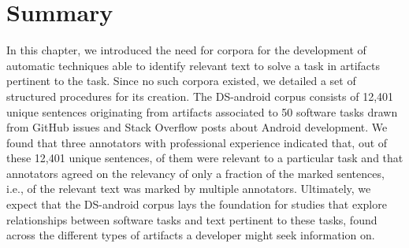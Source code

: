 
\section{Summary}
\label{cp4:corpus-summary}

In this chapter, we introduced the need for corpora 
for the development of 
automatic techniques able to identify relevant text
to solve a task in artifacts
pertinent to the task.
Since  no such corpora
existed, we detailed 
a set of structured procedures for its creation. 
The \acs{DS-android} corpus consists of  
12,401 unique sentences
originating from artifacts associated to 50 software tasks
drawn from GitHub issues and Stack Overflow posts about Android development. 
We found that 
three annotators with professional experience indicated that,
out of these 12,401 unique sentences, 
 of them were relevant to a particular task and that 
annotators agreed on the relevancy of  
only a fraction of the marked sentences, i.e.,  of the relevant text was marked by multiple annotators.
Ultimately, we expect that the \acs{DS-android} corpus
lays the foundation for studies that explore relationships between software tasks
and text pertinent to these tasks, found across the different types of artifacts a developer might seek information on.
 
